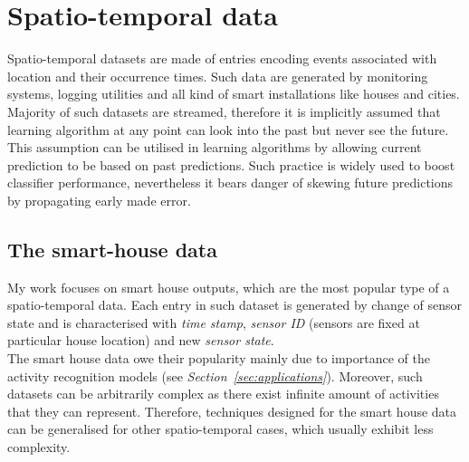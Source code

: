 \documentclass[10pt, a4paper, pdflatex, leqno, twoside, openright]{report}
\begin{document}
\chapter{Spatio-temporal data\label{ch:stData}}
Spatio-temporal datasets are made of entries encoding events associated with location and their occurrence times. Such data are generated by monitoring systems, logging utilities and all kind of smart installations like houses and cities. Majority of such datasets are streamed, therefore it is implicitly assumed that learning algorithm at any point can look into the past but never see the future.\\
This assumption can be utilised in learning algorithms by allowing current prediction to be based on past predictions. Such practice is widely used to boost classifier performance, nevertheless it bears danger of skewing future predictions by propagating early made error.

  \section{The smart-house data}
My work focuses on smart house outputs, which are the most popular type of a spatio-temporal data. Each entry in such dataset is generated by change of sensor state and is characterised with \emph{time stamp}, \emph{sensor ID} (sensors are fixed at particular house location) and new \emph{sensor state}.\\
The smart house data owe their popularity mainly due to importance of the activity recognition models (see \emph{Section~\ref{sec:applications}}). Moreover, such datasets can be arbitrarily complex as there exist infinite amount of activities that they can represent. Therefore, techniques designed for the smart house data can be generalised for other spatio-temporal cases, which usually exhibit less complexity.
\end{document}
